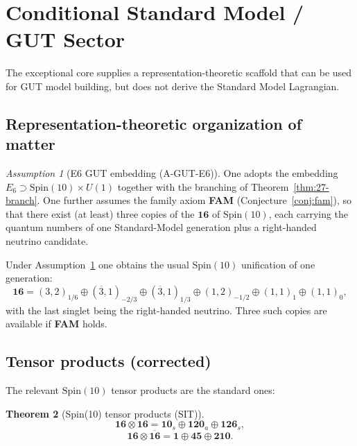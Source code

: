 \documentclass[11pt]{article}
\theoremstyle{plain}
\newtheorem{theorem}{Theorem}[section]
\theoremstyle{definition}
\theoremstyle{remark}
\newtheorem{assumption}[theorem]{Assumption}
\numberwithin{equation}{section}
\newcommand{\Spin}{\mathrm{Spin}}
\begin{document}
\section{Conditional Standard Model / GUT Sector}
\label{sec:sm}

The exceptional core supplies a representation-theoretic scaffold that can be used for GUT model building, but does not derive the Standard Model Lagrangian.

\subsection{Representation-theoretic organization of matter}

\begin{assumption}[E6 GUT embedding (A-GUT-E6)]\label{asm:gut-e6}
One adopts the embedding $E_6\supset\Spin(10)\times U(1)$ together with the branching of Theorem~\ref{thm:27-branch}. One further assumes the family axiom \textbf{FAM} (Conjecture~\ref{conj:fam}), so that there exist (at least) three copies of the $\mathbf{16}$ of $\Spin(10)$, each carrying the quantum numbers of one Standard-Model generation plus a right-handed neutrino candidate.
\end{assumption}

Under Assumption~\ref{asm:gut-e6} one obtains the usual $\Spin(10)$ unification of one generation:
\[
\mathbf{16} = (3,2)_{1/6} \oplus (\overline{3},1)_{-2/3} \oplus (\overline{3},1)_{1/3} \oplus (1,2)_{-1/2} \oplus (1,1)_{1} \oplus (1,1)_{0},
\]
with the last singlet being the right-handed neutrino. Three such copies are available if \textbf{FAM} holds.

\subsection{Tensor products (corrected)}

The relevant $\Spin(10)$ tensor products are the standard ones:

\begin{theorem}[Spin(10) tensor products (SIT)]\label{thm:spin10-tensors}
\[
\mathbf{16}\otimes\mathbf{16} = \mathbf{10}_s \oplus \mathbf{120}_a \oplus \mathbf{126}_s,
\]
\[
\mathbf{16}\otimes\overline{\mathbf{16}} = \mathbf{1} \oplus \mathbf{45} \oplus \mathbf{210}.
\]
\end{theorem}
\end{document}
